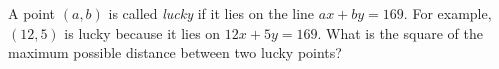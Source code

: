 A point $(a,b)$ is called \emph{lucky} if it lies on the line $ax+by=169$. For example, $(12,5)$ is lucky because it lies on $12x+5y=169$. What is the square of the maximum possible distance between two lucky points?
